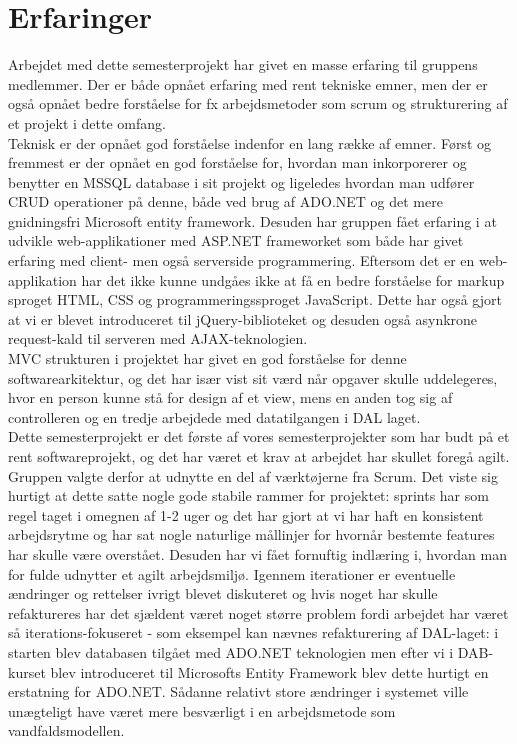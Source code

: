 \section{Erfaringer}
Arbejdet med dette semesterprojekt har givet en masse erfaring til gruppens medlemmer. Der er både opnået erfaring med rent tekniske emner, men der er også opnået bedre forståelse for fx arbejdsmetoder som scrum og strukturering af et projekt i dette omfang.\\
Teknisk er der opnået god forståelse indenfor en lang række af emner. Først og fremmest er der opnået en god forståelse for, hvordan man inkorporerer og benytter en MSSQL database i sit projekt og ligeledes hvordan man udfører CRUD operationer på denne, både ved brug af ADO.NET og det mere gnidningsfri Microsoft entity framework. Desuden har gruppen fået erfaring i at udvikle web-applikationer med ASP.NET frameworket som både har givet erfaring med client- men også serverside programmering. Eftersom det er en web-applikation har det ikke kunne undgåes ikke at få en bedre forståelse for markup sproget HTML, CSS og programmeringssproget JavaScript. Dette har også gjort at vi er blevet introduceret til jQuery-biblioteket og desuden også asynkrone request-kald til serveren med AJAX-teknologien.\\
MVC strukturen i projektet har givet en god forståelse for denne softwarearkitektur, og det har især vist sit værd når opgaver skulle uddelegeres, hvor en person kunne stå for design af et view, mens en anden tog sig af controlleren og en tredje arbejdede med datatilgangen i DAL laget. 
\\
Dette semesterprojekt er det første af vores semesterprojekter som har budt på et rent softwareprojekt, og det har været et krav at arbejdet har skullet foregå agilt. Gruppen valgte derfor at udnytte en del af værktøjerne fra Scrum. Det viste sig hurtigt at dette satte nogle gode stabile rammer for projektet: sprints har som regel taget i omegnen af 1-2 uger og det har gjort at vi har haft en konsistent arbejdsrytme og har sat nogle naturlige mållinjer for hvornår bestemte features har skulle være overstået. Desuden har vi fået fornuftig indlæring i, hvordan man for fulde udnytter et agilt arbejdsmiljø. Igennem iterationer er eventuelle ændringer og rettelser ivrigt blevet diskuteret og hvis noget har skulle refaktureres har det sjældent været noget større problem fordi arbejdet har været så iterations-fokuseret - som eksempel kan nævnes refakturering af DAL-laget: i starten blev databasen tilgået med ADO.NET teknologien men efter vi i DAB-kurset blev introduceret til Microsofts Entity Framework blev dette hurtigt en erstatning for ADO.NET. Sådanne relativt store ændringer i systemet ville unægteligt have været mere besværligt i en arbejdsmetode som vandfaldsmodellen. \\

